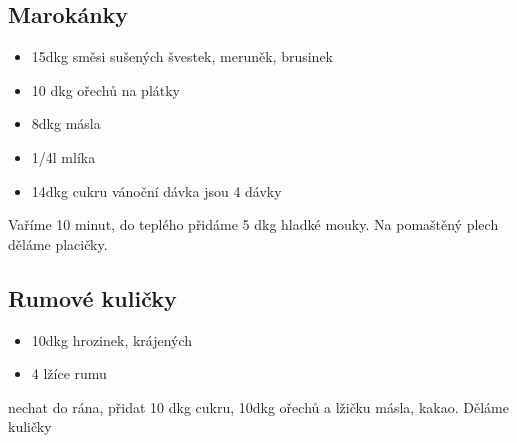 \documentclass[10pt,a4paper]{article}
\newenvironment{myitemize}
{ \begin{itemize}
    \setlength{\itemsep}{0pt}
    \setlength{\parskip}{0pt}
    \setlength{\parsep}{0pt}     }
{ \end{itemize}                  }
\begin{document}
\subsection{Marokánky}
\begin{minipage}[t]{0,5\textwidth}
\begin{myitemize} 
\item 15dkg směsi sušených švestek, meruněk, brusinek
\item 10 dkg ořechů na plátky
\item 8dkg másla
\item 1/4l mlíka
\item 14dkg cukru
vánoční dávka jsou 4 dávky
\end{myitemize}
\end{minipage}
\begin{minipage}[t]{0,5\textwidth}
Vaříme 10 minut, do teplého přidáme 5 dkg hladké mouky. Na pomaštěný plech děláme placičky.
\end{minipage}
\subsection{Rumové kuličky}
\begin{minipage}[t]{0,5\textwidth}
\begin{myitemize} 
\item 10dkg hrozinek, krájených
\item 4 lžíce rumu
\end{myitemize}
\end{minipage}
\begin{minipage}[t]{0,5\textwidth}
nechat do rána, přidat 10 dkg cukru, 10dkg ořechů a lžičku másla, kakao. Děláme kuličky
\end{minipage}
\end{document}
